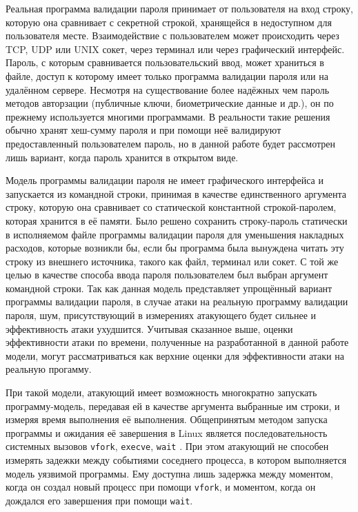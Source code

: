 Реальная программа валидации пароля принимает от пользователя на вход строку,
которую она сравнивает с секретной строкой, хранящейся в недоступном для
пользователя месте. Взаимодействие с пользователем может происходить через
TCP, UDP или UNIX сокет, через терминал или через графический интерфейс.
Пароль, с которым сравнивается пользовательский ввод, может храниться в файле,
доступ к которому имеет только программа валидации пароля или на удалённом
сервере. Несмотря на существование более надёжных чем пароль методов авторзации
(публичные ключи, биометрические данные и др.), он по прежнему используется
многими программами. В реальности такие решения обычно хранят хеш-сумму пароля и
при помощи неё валидируют предоставленный пользователем пароль, но в данной работе
будет рассмотрен лишь вариант, когда пароль хранится в открытом виде.

Модель программы валидации пароля не имеет графического интерфейса и запускается
из командной строки, принимая в качестве единственного аргумента строку, которую
она сравнивает со статической константной строкой-паролем, которая хранится в
её памяти. Было решено сохранить строку-пароль статически в исполняемом файле
программы валидации пароля для уменьшения накладных расходов, которые возникли
бы, если бы программа была вынуждена читать эту строку из внешнего источника,
такого как файл, терминал или сокет. С той же целью в качестве способа ввода
пароля пользователем был выбран аргумент командной строки. Так как данная модель
представляет упрощённый вариант программы валидации пароля, в случае атаки на
реальную программу валидации пароля, шум, присутствующий в измерениях атакующего
будет сильнее и эффективность атаки ухудшится. Учитывая сказанное выше,
оценки эффективности атаки по времени, полученные на разработанной в данной
работе модели, могут рассматриваться как верхние оценки для эффективности атаки
на реальную прогамму.

При такой модели, атакующий имеет возможность многократно запускать
программу-модель, передавая ей в качестве аргумента выбранные им строки, и
измеряя время выполнения её выполнения. Общепринятым методом запуска программы
и ожидания её завершения в Linux является последовательность системных вызовов
\texttt{vfork}, \texttt{execve}, \texttt{wait} \cite{kerrisk}. При этом
атакующий не способен измерять задежки между событиями соседнего процесса, в
котором выполняется модель уязвимой программы. Ему доступна лишь задержка между
моментом, когда он создал новый процесс при помощи \texttt{vfork}, и моментом,
когда он дождался его завершения при помощи \texttt{wait}.


